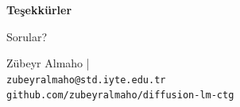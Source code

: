 \documentclass[10pt,aspectratio=169]{beamer}
\begin{document}
\begin{frame}[plain]
  \centering
  \vspace{2em}
  {\Huge \textbf{Teşekkürler}}
  \vspace{1.5em}

  {\Large Sorular?}
  \vspace{2em}

  \footnotesize
  Zübeyr Almaho \quad| \\
  \texttt{zubeyralmaho@std.iyte.edu.tr} \\
  \vspace{0.4em}
  \texttt{github.com/zubeyralmaho/diffusion-lm-ctg}
\end{frame}
\end{document}

